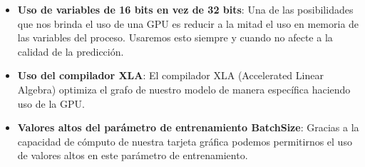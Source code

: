 \begin{itemize}
    \item \textbf{Uso de variables de 16 bits en vez de 32 bits}: Una de las posibilidades que nos brinda el uso de una GPU es reducir a la mitad el uso en memoria de las variables del proceso.
    Usaremos esto siempre y cuando no afecte a la calidad de la predicción.
    \item \textbf{Uso del compilador XLA}: El compilador XLA (Accelerated Linear Algebra) optimiza el grafo de nuestro modelo de manera específica haciendo uso de la GPU.
    \item \textbf{Valores altos del parámetro de entrenamiento BatchSize}: Gracias a la capacidad de cómputo de nuestra tarjeta gráfica podemos permitirnos el uso de valores altos en este parámetro de entrenamiento.
\end{itemize}


